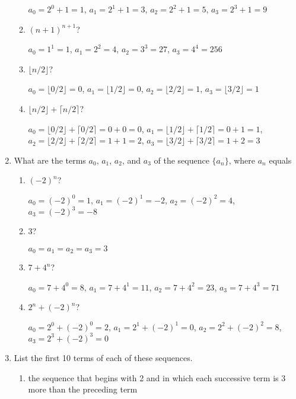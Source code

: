 \documentclass[11pt]{article}
\begin{document}
\begin{enumerate}[label=\textbf{\arabic*.}]
\begin{enumerate}[label=\textbf{\alph*)}]
		$a_0 = 2^0 + 1 = 1$, $a_1 = 2^1 + 1 = 3$, $a_2 = 2^2 + 1 = 5$, $a_3 = 2^3 + 1 = 9$
		
		\item $(n + 1)^{n + 1}$?
		
		$a_0 = 1^1 = 1$, $a_1 = 2^2 = 4$, $a_2 = 3^3 = 27$, $a_3 = 4^4 = 256$
		
		\item $\lfloor n / 2 \rfloor$?
		
		$a_0 = \lfloor 0 / 2 \rfloor = 0$, $a_1 = \lfloor 1 / 2 \rfloor = 0$, $a_2 = \lfloor 2 / 2 \rfloor = 1$, $a_3 = \lfloor 3 / 2 \rfloor = 1$
		
		\item $\lfloor n / 2 \rfloor + \lceil n / 2 \rceil$?
		
		$a_0 = \lfloor 0 / 2 \rfloor + \lceil 0 / 2 \rceil = 0 + 0 = 0$, $a_1 = \lfloor 1 / 2 \rfloor + \lceil 1 / 2 \rceil = 0 + 1 = 1$, $a_2 = \lfloor 2 / 2 \rfloor + \lceil 2 / 2 \rceil = 1 + 1 = 2$, $a_3 = \lfloor 3 / 2 \rfloor + \lceil 3 / 2 \rceil = 1 + 2 = 3$
	\end{enumerate}

	\item What are the terms $a_0$, $a_1$, $a_2$, and $a_3$ of the sequence $\{a_n\}$, where $a_n$ equals
	
	\begin{enumerate}[label=\textbf{\alph*)}]
		\item $(-2)^n$?
		
		$a_0 = (-2)^0 = 1$, $a_1 = (-2)^1 = -2$, $a_2 = (-2)^2 = 4$, $a_3 = (-2)^3 = -8$
		
		\item $3$?
		
		$a_0 = a_1 = a_2 = a_3 = 3$
		
		\item $7 + 4^n$?
		
		$a_0 = 7 + 4^0 = 8$, $a_1 = 7 + 4^1 = 11$, $a_2 = 7 + 4^2 = 23$, $a_3 = 7 + 4^3 = 71$
		
		\item $2^n + (-2)^n$?
		
		$a_0 = 2^0 + (-2)^0 = 2$, $a_1 = 2^1 + (-2)^1 = 0$, $a_2 = 2^2 + (-2)^2 = 8$, $a_3 = 2^3 + (-2)^3 = 0$
	\end{enumerate}

	\pagebreak
	\item List the first 10 terms of each of these sequences.
	
	\begin{enumerate}[label=\textbf{\alph*)}]
		\item the sequence that begins with 2 and in which each successive term is 3 more than the preceding term
		

\end{enumerate}
\end{enumerate}
\end{document}
